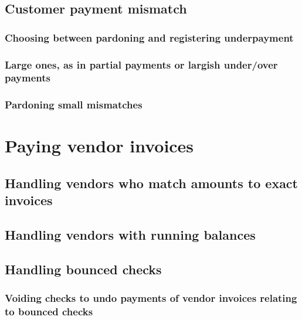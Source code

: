 \section{Customer payment mismatch}
\label{sec-starting-sales-payment-mismatch}

\subsection{Choosing between pardoning and registering underpayment}
\label{subsec-sales-payment-mismatch}

\subsection{Large ones, as in partial payments or largish under/over payments}
\label{subsec-sales-payment-partial}

\subsection{Pardoning small mismatches}
\label{subsec-sales-payment-pardoning}



\chapter{Paying vendor invoices}
\label{cha-starting-vendor-payments}

\section{Handling vendors who match amounts to exact invoices}
\label{sec-vendor-invoice-exact-match}

\section{Handling vendors with running balances}
\label{sec-vendor-invoice-running-balance}

\section{Handling bounced checks}
\label{sec-vendor-invoice-bounced-checks}

\subsection{Voiding checks to undo payments of vendor invoices
 relating to bounced checks}



